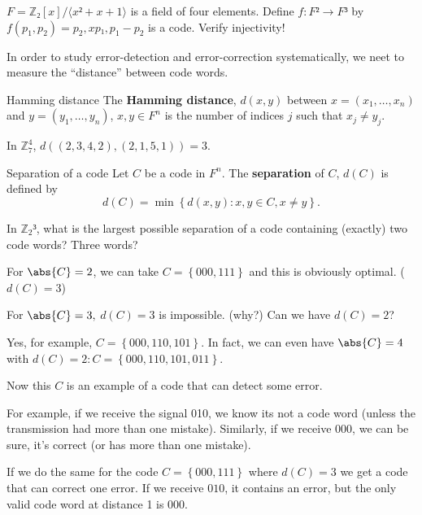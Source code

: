 \documentclass[english]{lbscript}
\begin{document}
\begin{example}{}{}
  \(F=ℤ₂[x]/⟨x²+x+1⟩\) is a field of four elements. Define \(f:F²→F³\) by \(f(p_1, p_2)=p_2, xp₁, p_1-p_2\) is a code. Verify injectivity!
\end{example}

In order to study error-detection and error-correction systematically, we neet to measure the \enquote{distance} between code words.

\begin{definition}{Hamming distance}{}
  The \textbf{Hamming distance}, \(d(x,y)\) between \(x=(x_1, \dots, x_n)\) and \(y=(y_1, \dots, y_n)\), \(x,y∈F^{n}\) is the number of indices \(j\) such that \(x_j≠y_j\).
\end{definition}

\begin{example}{}{}
  In \(ℤ_{7}^{4}\), \(d\left((2,3,4,2), (2,1,5,1) \right) = 3\).
\end{example}

\begin{definition}{Separation of a code}{}
  Let \(C\) be a code in \(F^{n}\). The \textbf{separation} of \(C\), \(d(C)\) is defined by
  \begin{equation}
    \label{eq:131}
    d(C)=\min\left\{ d(x,y): x,y∈C, x≠y \right\}.
  \end{equation}
\end{definition}

\begin{example}{}{}
  In \(ℤ_{2}³\), what is the largest possible separation of a code containing (exactly) two code words? Three words?

  For \(\abs{C}=2\), we can take \(C=\left\{ 000, 111 \right\} \) and this is obviously optimal. (\(d(C)=3\))

  For \(\abs{C}=3, \) \(d(C)=3\) is impossible. (why?) Can we have \(d(C)=2\)?

  Yes, for example, \(C=\left\{ 000, 110, 101 \right\} \). In fact, we can even have \(\abs{C}=4\) with \(d(C)=2: C=\left\{ 000, 110, 101, 011 \right\} \).

  Now this \(C\) is an example of a code that can detect some error.

  For example, if we receive the signal 010, we know its not a code word (unless the transmission had more than one mistake). Similarly, if we receive 000, we can be sure, it's correct (or has more than one mistake).

  If we do the same for the code \(C=\left\{ 000, 111 \right\} \) where \(d(C)=3\) we get a code that can correct one error. If we receive \(010\), it contains an error, but the only valid code word at distance 1 is 000.
\end{example}
\end{document}
